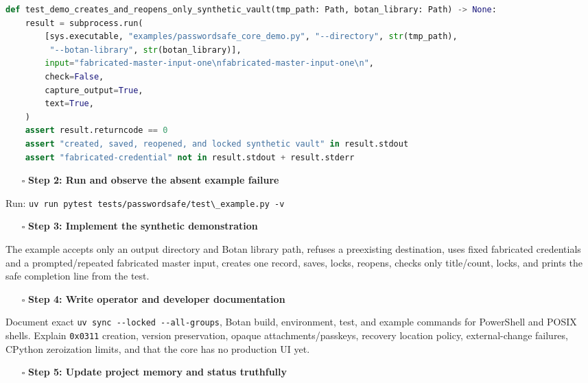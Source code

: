 \documentclass[
  letterpaper,
]{article}
\newcommand{\passthrough}[1]{#1}
\providecommand{\tightlist}{%
  \setlength{\itemsep}{0pt}\setlength{\parskip}{0pt}}
\begin{document}
\begin{lstlisting}[language=Python]
def test_demo_creates_and_reopens_only_synthetic_vault(tmp_path: Path, botan_library: Path) -> None:
    result = subprocess.run(
        [sys.executable, "examples/passwordsafe_core_demo.py", "--directory", str(tmp_path),
         "--botan-library", str(botan_library)],
        input="fabricated-master-input-one\nfabricated-master-input-one\n",
        check=False,
        capture_output=True,
        text=True,
    )
    assert result.returncode == 0
    assert "created, saved, reopened, and locked synthetic vault" in result.stdout
    assert "fabricated-credential" not in result.stdout + result.stderr
\end{lstlisting}

\begin{itemize}
\tightlist
\item[$\square$]
  \textbf{Step 2: Run and observe the absent example failure}
\end{itemize}

Run: \passthrough{\lstinline!uv run pytest tests/passwordsafe/test\_example.py -v!}

\begin{itemize}
\tightlist
\item[$\square$]
  \textbf{Step 3: Implement the synthetic demonstration}
\end{itemize}

The example accepts only an output directory and Botan library path, refuses a preexisting destination, uses fixed
fabricated credentials and a prompted/repeated fabricated master input, creates one record, saves, locks, reopens,
checks only title/count, locks, and prints the safe completion line from the test.

\begin{itemize}
\tightlist
\item[$\square$]
  \textbf{Step 4: Write operator and developer documentation}
\end{itemize}

Document exact \passthrough{\lstinline!uv sync --locked --all-groups!}, Botan build, environment, test, and example
commands for PowerShell and POSIX shells. Explain \passthrough{\lstinline!0x0311!} creation, version preservation,
opaque attachments/passkeys, recovery location policy, external-change failures, CPython zeroization limits, and that
the core has no production UI yet.

\begin{itemize}
\tightlist
\item[$\square$]
  \textbf{Step 5: Update project memory and status truthfully}
\end{itemize}
\end{document}
